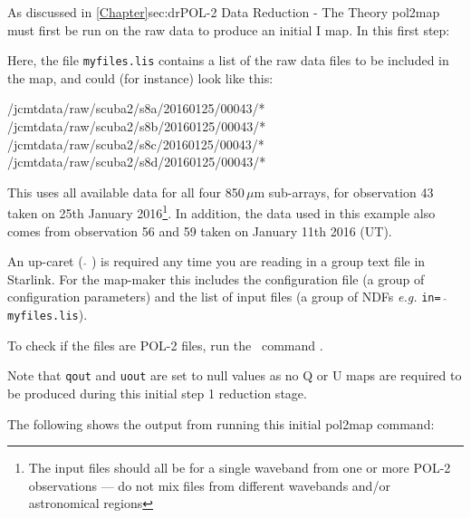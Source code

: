 As discussed in \cref{Chapter}{sec:dr}{POL-2 Data Reduction - The
  Theory} pol2map must first be run on the raw data to produce an
initial I map.  In this first step:

\begin{terminalv}
\end{terminalv}


Here, the file \texttt{myfiles.lis} contains a list of the raw data
files to be included in the map, and could (for instance) look like
this:

\begin{terminalv}
/jcmtdata/raw/scuba2/s8a/20160125/00043/*
/jcmtdata/raw/scuba2/s8b/20160125/00043/*
/jcmtdata/raw/scuba2/s8c/20160125/00043/*
/jcmtdata/raw/scuba2/s8d/20160125/00043/*
\end{terminalv}

This uses all available data for all four 850\,$\mu$m sub-arrays, for
observation 43 taken on 25th January 2016\footnote{The input files
  should all be for a single waveband from one or more POL-2
  observations --- do not mix files from different wavebands and/or
  astronomical regions}. In addition, the data used in this example
also comes from observation 56 and 59 taken on January 11th 2016 (UT).

\begin{tip}
  An up-caret ( $ \hat{} $ ) is required any time you are reading in a
  group text file in Starlink. For the map-maker this includes the
  configuration file (a group of configuration parameters) and the
  list of input files (a group of NDFs \emph{e.g.} \texttt{in= $
    \hat{} $ myfiles.lis}).

  To check if the files are POL-2 files, run the \smurf\ command
  .
\begin{terminalv}
\end{terminalv}
\end{tip}

Note that \texttt{qout} and \texttt{uout} are set to null values as no
Q or U maps are required to be produced during this initial step 1
reduction stage.

The following shows the output from running this initial pol2map
command:

